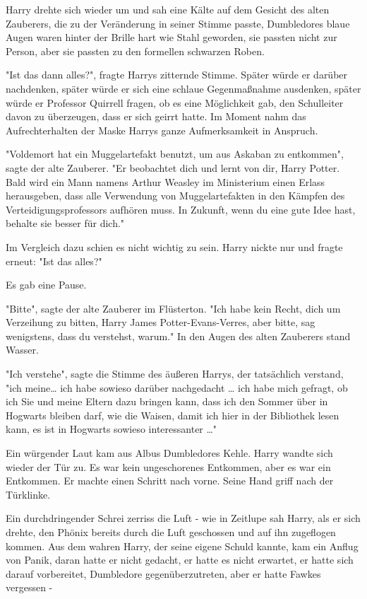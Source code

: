 {Harry drehte sich wieder um und sah eine Kälte auf dem Gesicht des alten Zauberers, die zu der Veränderung in seiner Stimme passte, Dumbledores blaue Augen waren hinter der Brille hart wie Stahl geworden, sie passten nicht zur Person, aber sie passten zu den formellen schwarzen Roben.

"Ist das dann alles?", fragte Harrys zitternde Stimme. Später würde er darüber nachdenken, später würde er sich eine schlaue Gegenmaßnahme ausdenken, später würde er Professor Quirrell fragen, ob es eine Möglichkeit gab, den Schulleiter davon zu überzeugen, dass er sich geirrt hatte. Im Moment nahm das Aufrechterhalten der Maske Harrys ganze Aufmerksamkeit in Anspruch.

"Voldemort hat ein Muggelartefakt benutzt, um aus Askaban zu entkommen", sagte der alte Zauberer. "Er beobachtet dich und lernt von dir, Harry Potter. Bald wird ein Mann namens Arthur Weasley im Ministerium einen Erlass herausgeben, dass alle Verwendung von Muggelartefakten in den Kämpfen des Verteidigungsprofessors aufhören muss. In Zukunft, wenn du eine gute Idee hast, behalte sie besser für dich."

Im Vergleich dazu schien es nicht wichtig zu sein. Harry nickte nur und fragte erneut: "Ist das alles?"

Es gab eine Pause.

"Bitte", sagte der alte Zauberer im Flüsterton. "Ich habe kein Recht, dich um Verzeihung zu bitten, Harry James Potter-Evans-Verres, aber bitte, sag wenigstens, dass du verstehst, warum." In den Augen des alten Zauberers stand Wasser.

"Ich verstehe", sagte die Stimme des äußeren Harrys, der tatsächlich verstand, "ich meine… ich habe sowieso darüber nachgedacht … ich habe mich gefragt, ob ich Sie und meine Eltern dazu bringen kann, dass ich den Sommer über in Hogwarts bleiben darf, wie die Waisen, damit ich hier in der Bibliothek lesen kann, es ist in Hogwarts sowieso interessanter …"

Ein würgender Laut kam aus Albus Dumbledores Kehle. Harry wandte sich wieder der Tür zu. Es war kein ungeschorenes Entkommen, aber es war ein Entkommen. Er machte einen Schritt nach vorne. Seine Hand griff nach der Türklinke.

Ein durchdringender Schrei zerriss die Luft - wie in Zeitlupe sah Harry, als er sich drehte, den Phönix bereits durch die Luft geschossen und auf ihn zugeflogen kommen. Aus dem wahren Harry, der seine eigene Schuld kannte, kam ein Anflug von Panik, daran hatte er nicht gedacht, er hatte es nicht erwartet, er hatte sich darauf vorbereitet, Dumbledore gegenüberzutreten, aber er hatte Fawkes vergessen -

}
